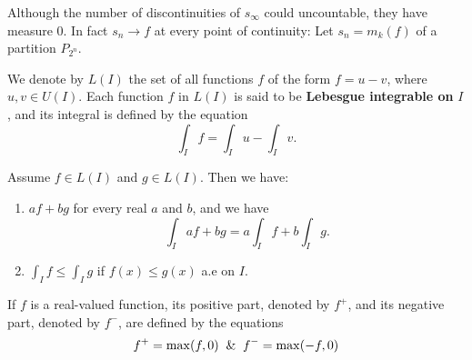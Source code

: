\documentclass[10pt,a4paper]{book}
\begin{document}
\PP Although the number of discontinuities of $s_\infty$ could uncountable, they have measure $0$. In fact $s_n \to f$ at every point of continuity: Let $s_n = m_k(f)$ of a partition $P_{2^n}.$

\begin{deff}

\end{deff} We denote by $L(I)$ the set of all functions $f$ of the form $f = u - v$, where $u, v \in U(I)$. Each function $f$ in $L(I)$ is said to be \textbf{Lebesgue integrable on} $I$, and its integral is defined by the equation
$$\int_I f = \int_I u - \int_I v.$$
\begin{Thm}
Assume $f \in L(I)$ and $g \in L(I)$. Then we have:
\begin{enumerate}
    \item $af + bg$ for every real $a$ and $b$, and we have
    $$\int_I af + bg =  a\int_I f + b\int_Ig.$$
    \item $\int_I f \leq \int_I g$ if $f(x) \leq g(x)$ a.e on $I$.
\end{enumerate}
\end{Thm}

\begin{deff}
If $f$ is a real-valued function, its positive part, denoted by $f^+$, and
its negative part, denoted by $f^-$, are defined by the equations
$$f^+ = \max(f,0) \And f^- = \max(-f,0)$$
\end{deff}
\end{document}
